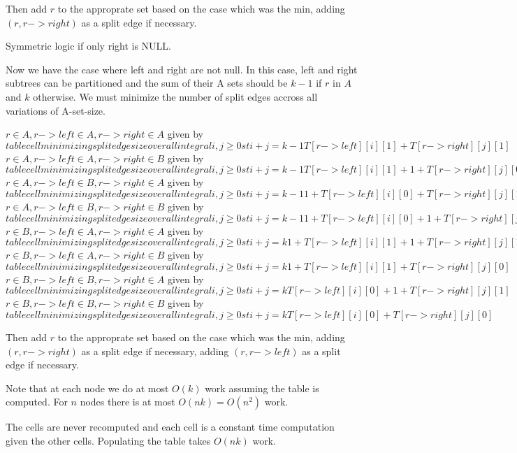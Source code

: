 \documentclass[11pt]{article}
\begin{document}
Then add $r$ to the approprate set based on the case which was the min,
adding $(r, r->right)$ as a split edge if necessary.

Symmetric logic if only right is NULL.

Now we have the case where left and right are not null. In this case,
left and right subtrees can be partitioned and the sum of their A sets should be $k-1$ if $r$ in $A$ and $k$ otherwise.
We must minimize the number of split edges accross all variations of A-set-size.

  $r \in A, r->left \in A, r->right \in A$ given by $table cell minimizing split edge size over all integral i,j \geq 0 st i+j = k-1       T[r->left][i][1] +     T[r->right][j][1]$ 
  $r \in A, r->left \in A, r->right \in B$ given by $table cell minimizing split edge size over all integral i,j \geq 0 st i+j = k-1       T[r->left][i][1] + 1 + T[r->right][j][0]$ 
  $r \in A, r->left \in B, r->right \in A$ given by $table cell minimizing split edge size over all integral i,j \geq 0 st i+j = k-1   1 + T[r->left][i][0] +     T[r->right][j][1]$ 
  $r \in A, r->left \in B, r->right \in B$ given by $table cell minimizing split edge size over all integral i,j \geq 0 st i+j = k-1   1 + T[r->left][i][0] + 1 + T[r->right][j][0]$ 
  $r \in B, r->left \in A, r->right \in A$ given by $table cell minimizing split edge size over all integral i,j \geq 0 st i+j = k     1 + T[r->left][i][1] + 1 + T[r->right][j][1]$ 
  $r \in B, r->left \in A, r->right \in B$ given by $table cell minimizing split edge size over all integral i,j \geq 0 st i+j = k     1 + T[r->left][i][1] +     T[r->right][j][0]$ 
  $r \in B, r->left \in B, r->right \in A$ given by $table cell minimizing split edge size over all integral i,j \geq 0 st i+j = k         T[r->left][i][0] + 1 + T[r->right][j][1]$ 
  $r \in B, r->left \in B, r->right \in B$ given by $table cell minimizing split edge size over all integral i,j \geq 0 st i+j = k         T[r->left][i][0] +     T[r->right][j][0]$ 

Then add $r$ to the approprate set based on the case which was the min,
adding $(r, r->right)$ as a split edge if necessary,
adding $(r, r->left)$ as a split edge if necessary.


Note that at each node we do at most $O(k)$ work assuming the table is computed.
For $n$ nodes there is at most $O(nk) = O(n^2)$ work.

The cells are never recomputed and each cell is a constant time computation given the other cells. Populating the table takes $O(nk)$ work.
\end{document}
